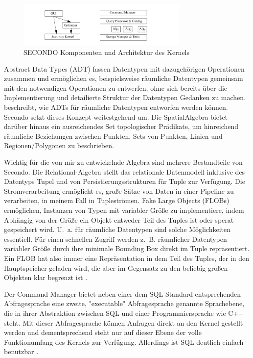 \documentclass[a4paper,12pt,twoside]{article}
\begin{document}
\begin{figure}
	\centering
	\includegraphics[width=0.75\textwidth]{Bilder/secondo.png}
	\caption{SECONDO Komponenten und Architektur des Kernels \autocite{Gueting2010}}
	\label{img:secondo}
\end{figure}

Abstract Data Types (ADT) fassen Datentypen mit dazugehörigen Operationen zusammen und ermöglichen es, beispielsweise räumliche Datentypen gemeinsam mit den notwendigen Operationen zu entwerfen, ohne sich bereits über die Implementierung und detailierte Struktur der Datentypen Gedanken zu machen. {\textcite[S. 75ff]{Rigaux2001}} beschreibt, wie ADTs für räumliche Datentypen entworfen werden können. Secondo setzt dieses Konzept weitestgehend um. Die SpatialAlgebra bietet darüber hinaus ein ausreichendes Set topologischer Prädikate, um hinreichend räumliche Beziehungen zwischen Punkten, Sets von Punkten, Linien und Regionen/Polygonen zu beschrieben.

Wichtig für die von mir zu entwickelnde Algebra sind mehrere Bestandteile von Secondo. Die Relational-Algebra stellt das relationale Datenmodell inklusive des Datentyps Tupel und von Persistierungsstrukturen für Tuple zur Verfügung. Die Stromverarbeitung ermöglicht es, große Sätze von Daten in einer Pipeline zu verarbeiten, in meinem Fall in Tupleströmen. Fake Large Objects (FLOBs) ermöglichen, Instanzen von Typen mit variabler Größe zu implementiere, indem Abhängig von der Größe ein Objekt entweder Teil des Tuples ist oder sperat gespeichert wird. U.~a. für räumliche Datentypen sind solche Möglichkeiten essentiell. Für einen schnellen Zugriff werden z.~B. räumlicher Datentypen variabler Größe durch ihre minimale Bounding Box direkt im Tuple repräsentiert. Ein FLOB hat also immer eine Repräsentation in dem Teil des Tuples, der in den Hauptspeicher geladen wird, die aber im Gegensatz zu den beliebig großen Objekten klar begrenzt ist \autocite{Gueting2010}.

Der Command-Manager bietet neben einer dem SQL-Standard entsprechenden Abfragesprache eine zweite, "executable" Abfragesprache genannte Sprachebene, die in ihrer Abstraktion zwischen SQL und einer Programmiersprache wie C++ steht.  Mit dieser Abfragesprache können Anfragen direkt an den Kernel gestellt werden und dementsprechend steht nur auf dieser Ebene der volle Funktionumfang des Kernels zur Verfügung. Allerdings ist SQL deutlich einfach benutzbar \autocite{Gueting2010}. 
 
\end{document}
